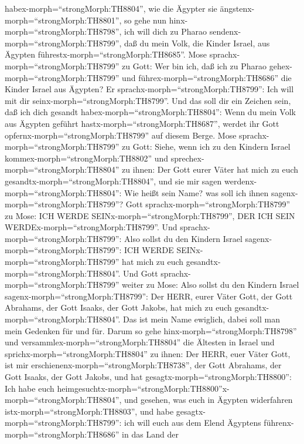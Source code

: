 habex-morph=``strongMorph:TH8804'', wie die Ägypter sie
ängstenx-morph=``strongMorph:TH8801'',  so gehe nun
hinx-morph=``strongMorph:TH8798'', ich will dich zu Pharao
sendenx-morph=``strongMorph:TH8799'', daß du mein Volk, die Kinder
Israel, aus Ägypten führestx-morph=``strongMorph:TH8685''. 
Mose sprachx-morph=``strongMorph:TH8799'' zu Gott: Wer bin ich, daß ich
zu Pharao gehex-morph=``strongMorph:TH8799'' und
führex-morph=``strongMorph:TH8686'' die Kinder Israel aus Ägypten?
 Er sprachx-morph=``strongMorph:TH8799'': Ich will mit dir
seinx-morph=``strongMorph:TH8799''. Und das soll dir ein Zeichen sein,
daß ich dich gesandt habex-morph=``strongMorph:TH8804'': Wenn du mein
Volk aus Ägypten geführt hastx-morph=``strongMorph:TH8687'', werdet ihr
Gott opfernx-morph=``strongMorph:TH8799'' auf diesem Berge.
 Mose sprachx-morph=``strongMorph:TH8799'' zu Gott: Siehe,
wenn ich zu den Kindern Israel kommex-morph=``strongMorph:TH8802'' und
sprechex-morph=``strongMorph:TH8804'' zu ihnen: Der Gott eurer Väter hat
mich zu euch gesandtx-morph=``strongMorph:TH8804'', und sie mir sagen
werdenx-morph=``strongMorph:TH8804'': Wie heißt sein Name? was soll ich
ihnen sagenx-morph=``strongMorph:TH8799''?  Gott
sprachx-morph=``strongMorph:TH8799'' zu Mose: ICH WERDE
SEINx-morph=``strongMorph:TH8799'', DER ICH SEIN
WERDEx-morph=``strongMorph:TH8799''. Und
sprachx-morph=``strongMorph:TH8799'': Also sollst du den Kindern Israel
sagenx-morph=``strongMorph:TH8799'': ICH WERDE
SEINx-morph=``strongMorph:TH8799'' hat mich zu euch
gesandtx-morph=``strongMorph:TH8804''.  Und Gott
sprachx-morph=``strongMorph:TH8799'' weiter zu Mose: Also sollst du den
Kindern Israel sagenx-morph=``strongMorph:TH8799'': Der HERR, eurer
Väter Gott, der Gott Abrahams, der Gott Isaaks, der Gott Jakobs, hat
mich zu euch gesandtx-morph=``strongMorph:TH8804''. Das ist mein Name
ewiglich, dabei soll man mein Gedenken für und für.  Darum
so gehe hinx-morph=``strongMorph:TH8798'' und
versammlex-morph=``strongMorph:TH8804'' die Ältesten in Israel und
sprichx-morph=``strongMorph:TH8804'' zu ihnen: Der HERR, euer Väter
Gott, ist mir erschienenx-morph=``strongMorph:TH8738'', der Gott
Abrahams, der Gott Isaaks, der Gott Jakobs, und hat
gesagtx-morph=``strongMorph:TH8800'': Ich habe euch
heimgesuchtx-morph=``strongMorph:TH8800''x-morph=``strongMorph:TH8804'',
und gesehen, was euch in Ägypten widerfahren
istx-morph=``strongMorph:TH8803'',  und habe
gesagtx-morph=``strongMorph:TH8799'': ich will euch aus dem Elend
Ägyptens führenx-morph=``strongMorph:TH8686'' in das Land der
